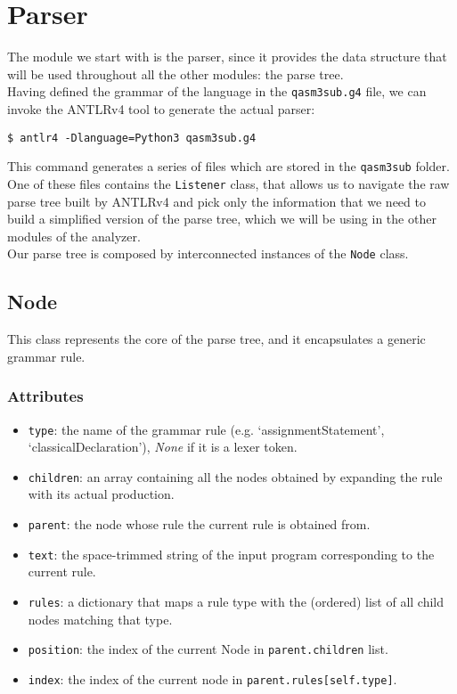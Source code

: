 \documentclass[12pt,a4paper]{report}
\theoremstyle{definition}
\theoremstyle{definition}
\theoremstyle{definition}
\begin{document}
\section{Parser}
The module we start with is the parser, since it provides the data structure that will be used throughout all the other modules: the parse tree.\\
Having defined the grammar of the language in the \texttt{qasm3sub.g4} file, we can invoke the ANTLRv4 tool \cite{antlr} to generate the actual parser:
\begin{lstlisting}
$ antlr4 -Dlanguage=Python3 qasm3sub.g4
\end{lstlisting}
This command generates a series of files which are stored in the \texttt{qasm3sub} folder. One of these files contains the \texttt{Listener} class, that allows us to navigate the raw parse tree built by ANTLRv4 and pick only the information that we need to build a simplified version of the parse tree, which we will be using in the other modules of the analyzer.\\
Our parse tree is composed by interconnected instances of the \texttt{Node} class.

\subsection{Node}
This class represents the core of the parse tree, and it encapsulates a generic grammar rule.
\subsubsection{Attributes}
\begin{itemize}
    \itemsep 0em
    \item \texttt{type}: the name of the grammar rule (e.g. `assignmentStatement', `classicalDeclaration'), \textit{None} if it is a lexer token.
    \item \texttt{children}: an array containing all the nodes obtained by expanding the rule with its actual production.
    \item \texttt{parent}: the node whose rule the current rule is obtained from.
    \item \texttt{text}: the space-trimmed string of the input program corresponding to the current rule.
    \item \texttt{rules}: a dictionary that maps a rule type with the (ordered) list of all child nodes matching that type.
    \item \texttt{position}: the index of the current Node in \texttt{parent.children} list.
    \item \texttt{index}: the index of the current node in \texttt{parent.rules[self.type]}.
\end{itemize}
\end{document}
